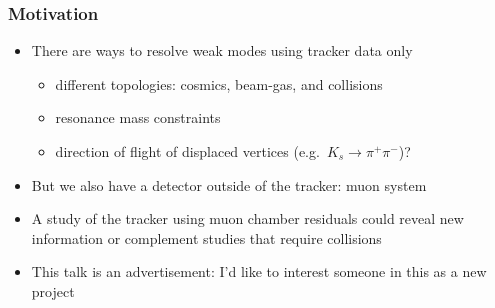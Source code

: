 \documentclass[compress]{beamer}
\begin{document}
\begin{frame}
\frametitle{Motivation}
\begin{itemize}\setlength{\itemsep}{0.5 cm}
\item There are ways to resolve weak modes using tracker data only
\begin{itemize}
\item different topologies: cosmics, beam-gas, and collisions
\item resonance mass constraints
\item direction of flight of displaced vertices (e.g.~$K_s \to \pi^+\pi^-$)?
\end{itemize}

\item But we also have a detector outside of the tracker: muon system

\item A study of the tracker using muon chamber residuals could reveal
  new information or complement studies that require collisions

\item This talk is an advertisement: I'd like to interest someone in this as a new project
\end{itemize}
\end{frame}
\end{document}
